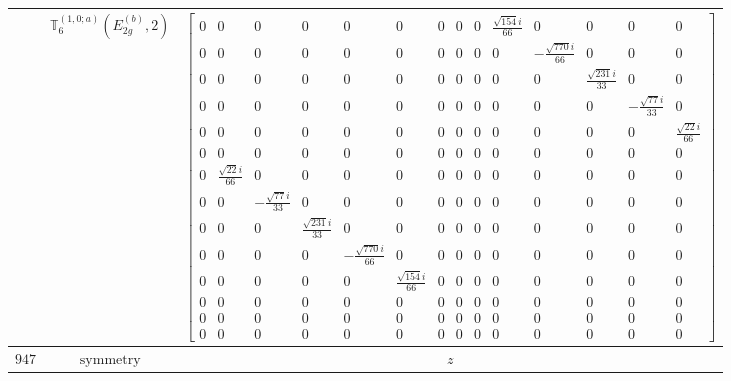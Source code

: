 \documentclass[fleqn,8pt,landscape]{jsarticle}
\begin{document}
\begin{longtable}{ccc}
$  $ & $ \mathbb{T}_{6}^{(1,0;a)}(E_{2g}^{(b)},2) $ & $ \begin{bmatrix} 0 & 0 & 0 & 0 & 0 & 0 & 0 & 0 & 0 & \frac{\sqrt{154} i}{66} & 0 & 0 & 0 & 0 \\ 0 & 0 & 0 & 0 & 0 & 0 & 0 & 0 & 0 & 0 & - \frac{\sqrt{770} i}{66} & 0 & 0 & 0 \\ 0 & 0 & 0 & 0 & 0 & 0 & 0 & 0 & 0 & 0 & 0 & \frac{\sqrt{231} i}{33} & 0 & 0 \\ 0 & 0 & 0 & 0 & 0 & 0 & 0 & 0 & 0 & 0 & 0 & 0 & - \frac{\sqrt{77} i}{33} & 0 \\ 0 & 0 & 0 & 0 & 0 & 0 & 0 & 0 & 0 & 0 & 0 & 0 & 0 & \frac{\sqrt{22} i}{66} \\ 0 & 0 & 0 & 0 & 0 & 0 & 0 & 0 & 0 & 0 & 0 & 0 & 0 & 0 \\ 0 & \frac{\sqrt{22} i}{66} & 0 & 0 & 0 & 0 & 0 & 0 & 0 & 0 & 0 & 0 & 0 & 0 \\ 0 & 0 & - \frac{\sqrt{77} i}{33} & 0 & 0 & 0 & 0 & 0 & 0 & 0 & 0 & 0 & 0 & 0 \\ 0 & 0 & 0 & \frac{\sqrt{231} i}{33} & 0 & 0 & 0 & 0 & 0 & 0 & 0 & 0 & 0 & 0 \\ 0 & 0 & 0 & 0 & - \frac{\sqrt{770} i}{66} & 0 & 0 & 0 & 0 & 0 & 0 & 0 & 0 & 0 \\ 0 & 0 & 0 & 0 & 0 & \frac{\sqrt{154} i}{66} & 0 & 0 & 0 & 0 & 0 & 0 & 0 & 0 \\ 0 & 0 & 0 & 0 & 0 & 0 & 0 & 0 & 0 & 0 & 0 & 0 & 0 & 0 \\ 0 & 0 & 0 & 0 & 0 & 0 & 0 & 0 & 0 & 0 & 0 & 0 & 0 & 0 \\ 0 & 0 & 0 & 0 & 0 & 0 & 0 & 0 & 0 & 0 & 0 & 0 & 0 & 0 \end{bmatrix} $ \\ \hline
$ 947 $ & $ \text{symmetry} $ & $ z $ \\

\end{longtable}
\end{document}
